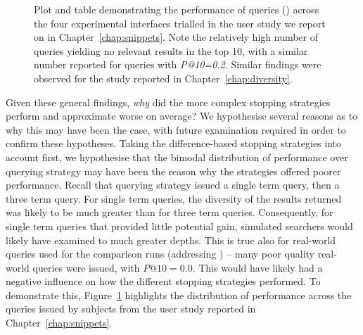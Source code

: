 \begin{figure}[t!]
    \centering
    \caption[Query performance by real-world subjects]{Plot and table demonstrating the performance of queries () across the four experimental interfaces trialled in the user study we report on in Chapter~\ref{chap:snippets}. Note the relatively high number of queries yielding no relevant results in the top 10, with a similar number reported for queries with \emph{P@10=0.2}. Similar findings were observed for the study reported in Chapter~\ref{chap:diversity}.}
    \label{fig:query_performance_ch7}
\end{figure}

Given these general findings, \emph{why} did the more complex stopping strategies perform and approximate worse on average? We hypothesise several reasons as to why this may have been the case, with future examination required in order to confirm these hypotheses. Taking the difference-based stopping strategies into account first, we hypothesise that the bimodal distribution of performance over querying strategy  may have been the reason why the strategies offered poorer performance. Recall that querying strategy  issued a single term query, then a three term query. For single term queries, the diversity of the results returned was likely to be much greater than for three term queries. Consequently, for single term queries that provided little potential gain, simulated searchers would likely have examined to much greater depths. This is true also for real-world queries used for the comparison runs (addressing ) -- many poor quality real-world queries were issued, with $P@10=0.0$. This would have likely had a negative influence on how the different stopping strategies performed. To demonstrate this, Figure~\ref{fig:query_performance_ch7} highlights the distribution of performance across the queries issued by subjects from the user study reported in Chapter~\ref{chap:snippets}.

